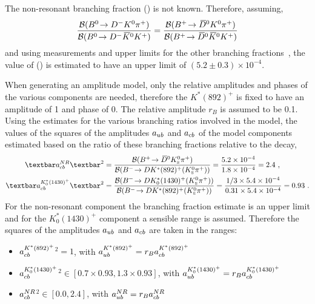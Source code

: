 The non-resonant branching fraction \BR(\decay{\Bp}{\Dzb\KS\pip}) is not known. Therefore, assuming,
\begin{equation*}
\frac{{\mathcal{B}}({{B}^0}\!\rightarrow {\ensuremath{{D}^-}}{\ensuremath{{K}^0}}{\ensuremath{{\pi}^+}})}{{\mathcal{B}}({{B}^0}\!\rightarrow {\ensuremath{{D}^-}}{\ensuremath{{\kern 0.2em\overline{\kern -0.2em K}{}}{}^0}}{\ensuremath{{K}^+}})} = \frac{{\mathcal{B}}({{{B}^+}}\!\rightarrow {\ensuremath{{\kern 0.2em\overline{\kern -0.2em D}{}}{}^0}}{\ensuremath{{K}^0}}{\ensuremath{{\pi}^+}})}{{\mathcal{B}}({{{B}^+}}\!\rightarrow {\ensuremath{{\kern 0.2em\overline{\kern -0.2em D}{}}{}^0}}{\ensuremath{{\kern 0.2em\overline{\kern -0.2em K}{}}{}^0}}{\ensuremath{{K}^+}})}
\end{equation*}
and using measurements and upper limits for the other branching fractions~\cite{PDG2014}, the value of \BR(\decay{\Bp}{\Dzb\KS\pip}) is estimated to have an upper limit of $(5.2 \pm 0.3) \times 10^{-4}$.

When generating an amplitude model, only the relative amplitudes and phases of the various components are needed, therefore the $K^*(892)^+$ is fixed to have an amplitude of 1 and phase of 0. The relative amplitude $r_B$ is assumed to be 0.1. Using the estimates for the various branching ratios involved in the model, the values of the squares of the amplitudes $a_{{u}{b}}$ and $a_{{c}{b}}$ of the model components estimated based on the ratio of these branching fractions relative to the  decay,
\begin{align*}
\textbar a_{\cquark\bquark}^{NR}\textbar^2 &= \frac{\BR(\decay{\Bp}{\Dzb\KS\pip})}{\BR(\decay{\Bm}{\D K^*(892)^+(\KS\pip)})} = \frac{5.2 \times 10^{-4}}{1.8 \times 10^{-4}} = 2.4 \text{ ,} \\
\textbar a_{\cquark\bquark}^{K^*_0(1430)^+}\textbar^2 &= \frac{\BR(\decay{\Bm}{\D K^*_0(1430)^+(\KS\pip)})}{\BR(\decay{\Bm}{\D K^*(892)^+(\KS\pip)})} = \frac{1/3 \times 5.4 \times 10^{-4}}{0.31 \times 5.4 \times 10^{-4}} = 0.93 \text{ .}
\end{align*}
For the non-resonant component the branching fraction estimate is an upper limit and for the $K^*_0(1430)^+$  component a sensible range is assumed. Therefore the squares of the amplitudes $a_{{u}{b}}$ and $a_{{c}{b}}$ are taken in the ranges:

\begin{itemize}
\item \textbar $a_{{c}{b}}^{K^*(892)^+}$\textbar$^2 = 1$, \hspace{12pt} with $a_{{u}{b}}^{K^*(892)^+} = r_B a_{{c}{b}}^{K^*(892)^+}$
\item \textbar $a_{{c}{b}}^{K^*_0(1430)^+}$\textbar$^2 \in [0.7 \times 0.93,1.3 \times 0.93]$, \hspace{14pt} with $a_{{u}{b}}^{K^*_0(1430)^+} = r_B a_{{c}{b}}^{K^*_0(1430)^+}$
\item \textbar $a_{{c}{b}}^{NR}$\textbar$^2 \in [0.0,2.4]$, \hspace{12pt} with $a_{{u}{b}}^{NR} = r_B a_{{c}{b}}^{NR}$
\end{itemize}

